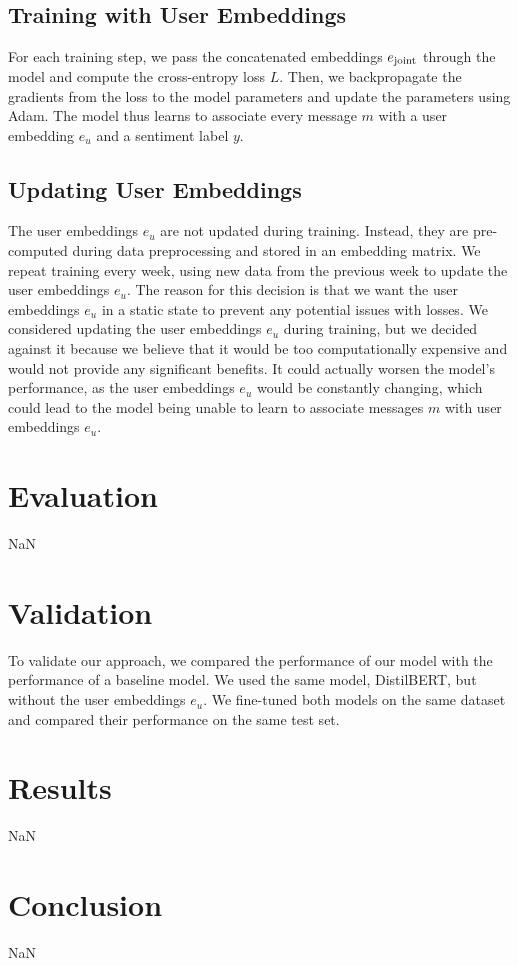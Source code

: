 \documentclass{article}
\begin{document}
\subsection{Training with User Embeddings}
For each training step, we pass the concatenated embeddings $e_\textnormal{joint}$ through the model and compute the cross-entropy loss $L$. Then, we backpropagate the gradients from the loss to the model parameters and update the parameters using Adam. The model thus learns to associate every message $m$ with a user embedding $e_u$ and a sentiment label $y$.

\subsection{Updating User Embeddings}
The user embeddings $e_u$ are not updated during training. Instead, they are pre-computed during data preprocessing and stored in an embedding matrix. We repeat training every week, using new data from the previous week to update the user embeddings $e_u$. The reason for this decision is that we want the user embeddings $e_u$ in a static state to prevent any potential issues with losses. We considered updating the user embeddings $e_u$ during training, but we decided against it because we believe that it would be too computationally expensive and would not provide any significant benefits. It could actually worsen the model's performance, as the user embeddings $e_u$ would be constantly changing, which could lead to the model being unable to learn to associate messages $m$ with user embeddings $e_u$.

\section{Evaluation}
NaN

\section{Validation}
To validate our approach, we compared the performance of our model with the performance of a baseline model. We used the same model, DistilBERT, but without the user embeddings $e_u$. We fine-tuned both models on the same dataset and compared their performance on the same test set.
\section{Results}
NaN

\section{Conclusion}
NaN

\printbibliography

\end{document}
